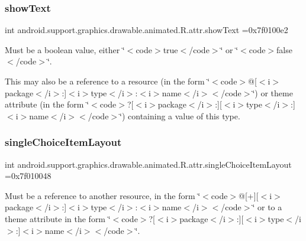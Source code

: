 \subsubsection{\texorpdfstring{show\+Text}{showText}}
{\footnotesize\ttfamily int android.\+support.\+graphics.\+drawable.\+animated.\+R.\+attr.\+show\+Text =0x7f0100e2\hspace{0.3cm}{\ttfamily [static]}}

Must be a boolean value, either \char`\"{}$<$code$>$true$<$/code$>$\char`\"{} or \char`\"{}$<$code$>$false$<$/code$>$\char`\"{}. 

This may also be a reference to a resource (in the form \char`\"{}$<$code$>$@\mbox{[}$<$i$>$package$<$/i$>$\+:\mbox{]}$<$i$>$type$<$/i$>$\+:$<$i$>$name$<$/i$>$$<$/code$>$\char`\"{}) or theme attribute (in the form \char`\"{}$<$code$>$?\mbox{[}$<$i$>$package$<$/i$>$\+:\mbox{]}\mbox{[}$<$i$>$type$<$/i$>$\+:\mbox{]}$<$i$>$name$<$/i$>$$<$/code$>$\char`\"{}) containing a value of this type. \mbox{\label{classandroid_1_1support_1_1graphics_1_1drawable_1_1animated_1_1R_1_1attr_afa4abea97d90906b32b3a4c1470bb756}} 
\subsubsection{\texorpdfstring{single\+Choice\+Item\+Layout}{singleChoiceItemLayout}}
{\footnotesize\ttfamily int android.\+support.\+graphics.\+drawable.\+animated.\+R.\+attr.\+single\+Choice\+Item\+Layout =0x7f010048\hspace{0.3cm}{\ttfamily [static]}}

Must be a reference to another resource, in the form \char`\"{}$<$code$>$@\mbox{[}+\mbox{]}\mbox{[}$<$i$>$package$<$/i$>$\+:\mbox{]}$<$i$>$type$<$/i$>$\+:$<$i$>$name$<$/i$>$$<$/code$>$\char`\"{} or to a theme attribute in the form \char`\"{}$<$code$>$?\mbox{[}$<$i$>$package$<$/i$>$\+:\mbox{]}\mbox{[}$<$i$>$type$<$/i$>$\+:\mbox{]}$<$i$>$name$<$/i$>$$<$/code$>$\char`\"{}. \mbox{\label{classandroid_1_1support_1_1graphics_1_1drawable_1_1animated_1_1R_1_1attr_a6f33c0ffc42e5387522c43da4bc94897}} 
